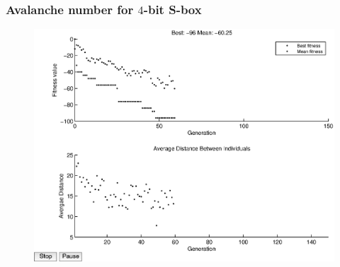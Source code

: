 \documentclass[handout]{beamer}
\begin{document}

\begin{frame}
	\frametitle{Avalanche number for $4$-bit S-box}
\begin{figure}
\centering
	\includegraphics[scale=0.5]{images/avalanche_results16.eps}
\end{figure}
\end{frame}
\end{document}
